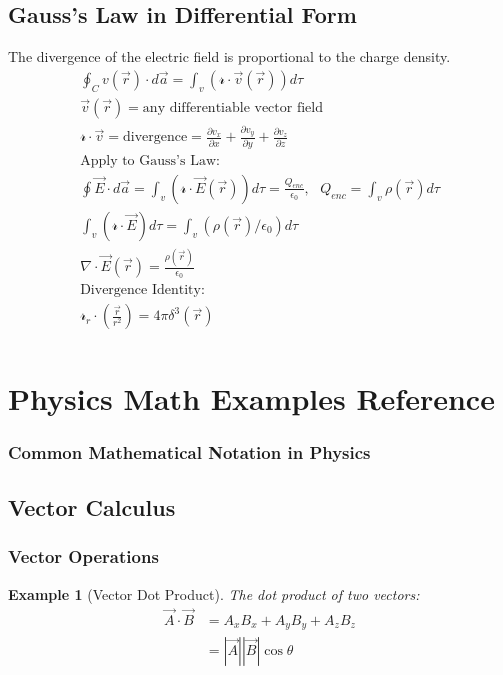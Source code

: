 \documentclass{article}
\newtheorem{example}[theorem]{Example}
\begin{document}
\subsection{Gauss's Law in Differential Form}
\begin{conceptbox}
The divergence of the electric field is proportional to the charge density.
\begin{align*}
    \oint_C v(\vec{r}) \cdot d\vec{a} = \int_v (\mathcal{r}\cdot\vec{v}(\vec{r}))d\tau \\
    \vec{v}(\vec{r}) = \text{any differentiable vector field} \\
    \mathcal{r}\cdot\vec{v} = \text{divergence} = \frac{\partial v_x}{\partial x} + \frac{\partial v_y}{\partial y} + \frac{\partial v_z}{\partial z} \\
    \text{Apply to Gauss's Law}: \\
    \oint \vec{E} \cdot d\vec{a} = \int_v (\mathcal{r}\cdot\vec{E}(\vec{r}))d\tau = \frac{Q_{enc}}{\epsilon_0}, \text{ } Q_{enc} = \int_v \rho(\vec{r})d\tau \\
    \int_v(\mathcal{r}\cdot\vec{E})d\tau = \int_v(\rho(\vec{r})/\epsilon_0)d\tau \\
    \nabla\cdot\vec{E}(\vec{r}) = \frac{\rho(\vec{r})}{\epsilon_0} \\
    \text{Divergence Identity: }\\
    \mathcal{r}_r\cdot(\frac{\vec{r}}{r^2}) = 4\pi\delta^3(\vec{r}) \\
\end{align*}
\end{conceptbox}

\newpage
\section{Physics Math Examples Reference}
\subsubsection*{Common Mathematical Notation in Physics}

\subsection{Vector Calculus}

\subsubsection{Vector Operations}
\begin{example}[Vector Dot Product]
The dot product of two vectors:
\begin{align*}
    \vec{A} \cdot \vec{B} &= A_x B_x + A_y B_y + A_z B_z \\
    &= |\vec{A}||\vec{B}|\cos\theta
\end{align*}
\end{example}
\end{document}
